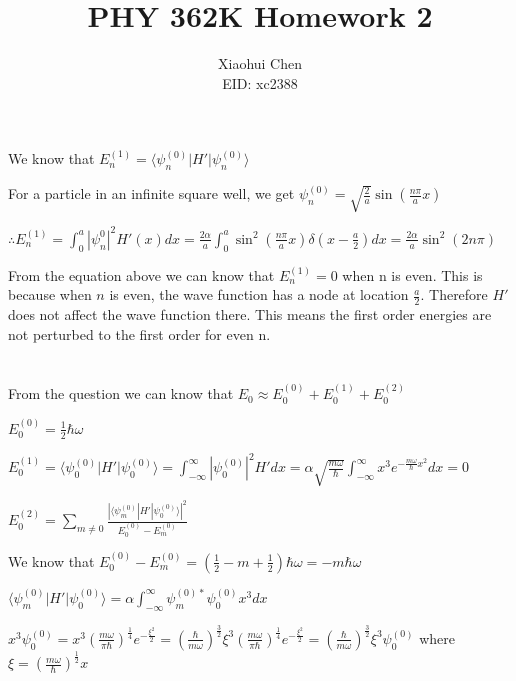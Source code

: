 \documentclass[12pt]{article}
\author{Xiaohui Chen \\EID: xc2388}
\title{PHY 362K Homework 2}
\begin{document}
\maketitle
\begin{spacing}{2.0}

\section{} %
We know that $E_n^{(1)}=\langle \psi_n^{(0)}| H' | \psi_n^{(0)} \rangle$

For a particle in an infinite square well, we get $\psi_n^{(0)}= \sqrt{\frac{2}{a}}\sin (\frac{n\pi}{a}x)$

$\therefore E_n^{(1)}=\int_{0}^{a} |\psi_n^{0}|^2 H'(x) dx=\frac{2\alpha}{a} \int_{0}^{a} \sin^2 (\frac{n\pi}{a}x) \delta(x-\frac{a}{2}) dx =\boxed{\frac{2\alpha}{a} \sin^2(2n\pi)}$

From the equation above we can know that $E_n^{(1)}=0$ when n is even. This is because when $n$ is even, the wave function has a node at location $\frac{a}{2}$. Therefore $H'$ does not affect the wave function there. This means the first order energies are not perturbed to the first order for even n.

\section{} %
From the question we can know that $E_{0}\approx E_{0}^{(0)}+ E_{0}^{(1)}+ E_{0}^{(2)}$

$E_{0}^{(0)}=\frac{1}{2}\hbar\omega$

$E_{0}^{(1)}=\langle \psi_0^{(0)}| H' | \psi_0^{(0)} \rangle = \int_{-\infty}^{\infty} |\psi_0^{(0)}|^2 H' dx= \alpha \sqrt{\frac{m\omega}{\hbar}} \int_{-\infty}^{\infty} x^3 e^{-\frac{m\omega}{\hbar}x^2} dx= 0$

$E_{0}^{(2)}=\sum_{m \ne 0} \frac{|\langle \psi_m^{(0)}| H' | \psi_0^{(0)} \rangle|^2}{E_0^{(0)}-E_m^{(0)}}$

We know that $E_0^{(0)}-E_m^{(0)}=(\frac{1}{2}- m+ \frac{1}{2})\hbar \omega=-m\hbar\omega$

$\langle \psi_m^{(0)}| H' | \psi_0^{(0)} \rangle= \alpha \int_{-\infty}^{\infty} \psi_m^{(0)*}\psi_0^{(0)} x^3 dx$

$x^3\psi_0^{(0)}=x^3\left( \frac{m\omega}{\pi\hbar}\right)^{\frac{1}{4}} e^{-\frac{\xi^2}{2}}= \left(\frac{\hbar }{m\omega}\right)^{\frac{3}{2}}\xi^3\left( \frac{m\omega}{\pi\hbar}\right)^{\frac{1}{4}} e^{-\frac{\xi^2}{2}}= \left(\frac{\hbar }{m\omega}\right)^{\frac{3}{2}}\xi^3 \psi_0^{(0)}$ where $\xi=\left(\frac{m\omega}{\hbar}\right)^{\frac{1}{2}}x$


\end{spacing}
\end{document}
